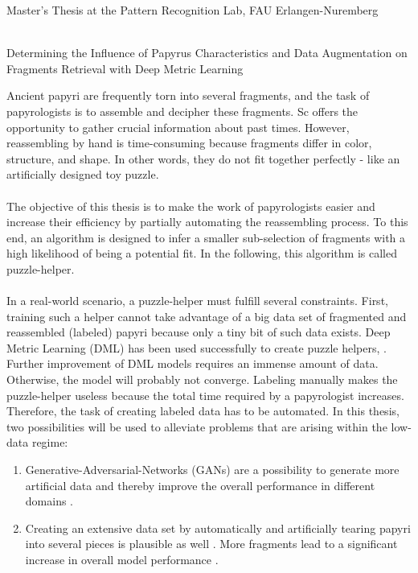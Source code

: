 \documentclass[12pt,a4paper]{article}
\begin{document}
\begin{center}
	Master's Thesis at the Pattern Recognition Lab, FAU Erlangen-Nuremberg 
																		
	\mbox{}\\
	{\Large Determining the Influence of Papyrus Characteristics and Data Augmentation on Fragments Retrieval with Deep Metric Learning}			
\end{center}
Ancient papyri are frequently torn into several fragments, and the task of papyrologists is to assemble and decipher these fragments. Sc offers the opportunity to gather crucial information about past times. However, reassembling by hand is time-consuming because fragments differ in color, structure, and shape. In other words, they do not fit together perfectly - like an artificially designed toy puzzle. 
\\\\
The objective of this thesis is to make the work of papyrologists easier and increase their efficiency by partially automating the reassembling process. To this end, an algorithm is designed to infer a smaller sub-selection of fragments with a high likelihood of being a potential fit. In the following, this algorithm is called puzzle-helper.
\\\\
In a real-world scenario, a puzzle-helper must fulfill several constraints. First, training such a helper cannot take advantage of a big data set of fragmented and reassembled (labeled) papyri because only a tiny bit of such data exists. Deep Metric Learning (DML) has been used successfully to create puzzle helpers, \cite{Ostertag21, Pirrone21}. Further improvement of DML models requires an immense amount of data. Otherwise, the model will probably not converge. Labeling manually makes the puzzle-helper useless because the total time required by a papyrologist increases. Therefore, the task of creating labeled data has to be automated. In this thesis, two possibilities will be used to alleviate problems that are arising within the low-data regime: 
\begin{enumerate}
	\item Generative-Adversarial-Networks (GANs) are a possibility to generate more artificial data and thereby improve the overall performance in different domains \cite{Tamrin21}.
	\item Creating an extensive data set by automatically and artificially tearing papyri into several pieces is plausible as well \cite{Seuret21}. More fragments lead to a significant increase in overall model performance \cite{Pirrone21, Ostertag21}.
\end{enumerate}
\end{document}
